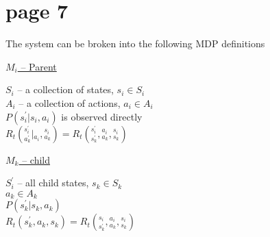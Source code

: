 \section*{page 7}

The system can be broken into the following MDP definitions

\underline{$M_i$ -- Parent}

$S_i$ -- a collection of states, $s_i\in S_i$\\
$A_i$ -- a collection of actions, $a_i \in A_i$\\

$P(s^\prime_i|s_i, a_i)$ is observed directly\\

$R_t\left({}^{s^\prime_i}_{a^\prime_k}|{}_{a_i},{}^{s_i}_{a_k}\right)=R_t\left({}^{s^\prime_i}_{s^\prime_k},{}^{a_i}_{a_k},{}^{s_i}_{s_k}\right)$

\underline{$M_k$ -- child}

$S^\prime_i$ -- all child states, $s_k\in S_k$\\
$a_k\in A_k$\\
$P(s^\prime_k|s_k,a_k)$\\
$R_t(s^\prime_k,a_k,s_k)=R_t\left({}^{s_i}_{s^\prime_k},{}^{a_i}_{a_k},{}^{s_i}_{s_k}\right)$